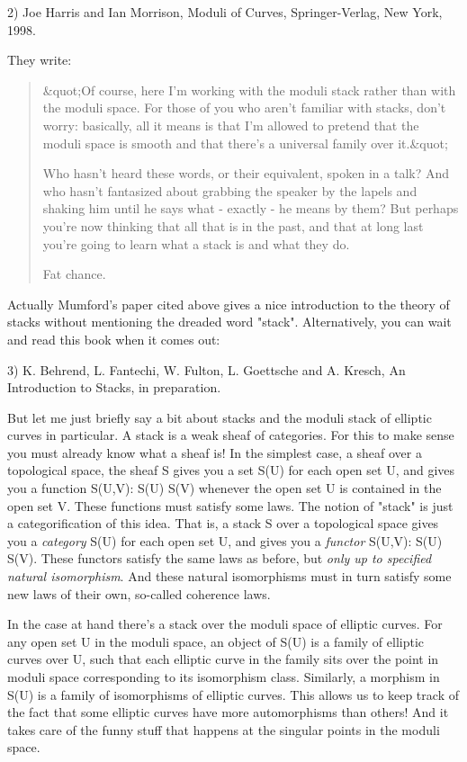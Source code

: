2) Joe Harris and Ian Morrison, Moduli of Curves, Springer-Verlag, New
York, 1998.

They write:

\begin{quote}
     &quot;Of course, here I'm working with the moduli stack rather than 
     with the moduli space.  For those of you who aren't familiar with
     stacks, don't worry: basically, all it means is that I'm allowed to
     pretend that the moduli space is smooth and that there's a universal
     family over it.&quot;

     Who hasn't heard these words, or their equivalent, spoken in a
     talk?  And who hasn't fantasized about grabbing the speaker by
     the lapels and shaking him until he says what - exactly - he means
     by them?  But perhaps you're now thinking that all that is in the
     past, and that at long last you're going to learn what a stack is
     and what they do.

     Fat chance.  

\end{quote}
    
Actually Mumford's paper cited above gives a nice introduction to
the theory of stacks without mentioning the dreaded word "stack".  
Alternatively, you can wait and read this book when it comes out:

3) K. Behrend, L. Fantechi, W. Fulton, L. Goettsche and A. Kresch,
An Introduction to Stacks, in preparation.

But let me just briefly say a bit about stacks and the moduli stack of
elliptic curves in particular.  A stack is a weak sheaf of categories.
For this to make sense you must already know what a sheaf is!  In the
simplest case, a sheaf over a topological space, the sheaf S gives you
a set S(U) for each open set U, and gives you a function S(U,V): S(U)
\to  S(V) whenever the open set U is contained in the open set V.  These
functions must satisfy some laws.  The notion of "stack" is just a
categorification of this idea.  That is, a stack S over a topological
space gives you a \emph{category} S(U) for each open set U, and gives you a
\emph{functor} S(U,V): S(U) \to  S(V).  These functors satisfy the same laws
as before, but \emph{only up to specified natural isomorphism}.  And these
natural isomorphisms must in turn satisfy some new laws of their own,
so-called coherence laws.

In the case at hand there's a stack over the moduli space of elliptic
curves.  For any open set U in the moduli space, an object of S(U) is a
family of elliptic curves over U, such that each elliptic curve in the
family sits over the point in moduli space corresponding to its
isomorphism class.  Similarly, a morphism in S(U) is a family of
isomorphisms of elliptic curves.  This allows us to keep track of the
fact that some elliptic curves have more automorphisms than others!  And
it takes care of the funny stuff that happens at the singular points in
the moduli space.


